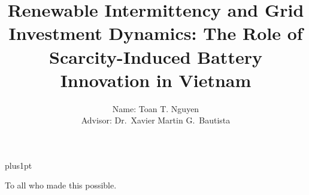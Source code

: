\documentclass{fulbrightthesis}
\title{Renewable Intermittency and Grid Investment Dynamics: The Role of Scarcity-Induced Battery Innovation in Vietnam}
\author{Name: Toan T. Nguyen \\ Advisor: Dr.\ Xavier Martin G.\ Bautista}
\begin{document}
\baselineskip=18pt plus1pt
\setcounter{secnumdepth}{3}
\setcounter{tocdepth}{3}
\maketitle

\begin{dedication}
    To all who made this possible.
\end{dedication}

\end{document}
